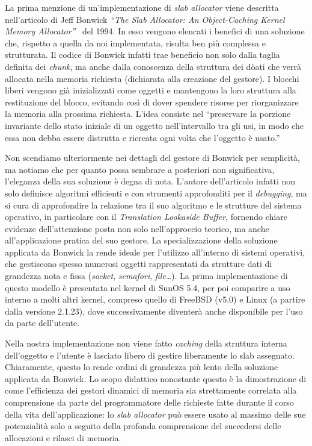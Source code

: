 La prima menzione di un’implementazione di \textit{slab allocator} viene descritta nell’articolo di Jeff Bonwick \textit{“The Slab Allocator: An Object-Caching Kernel Memory Allocator”}~\cite{slab} del 1994. In esso vengono elencati i benefici di una soluzione che, rispetto a quella da noi implementata, risulta ben più complessa e strutturata. Il codice di Bonwick infatti trae beneficio non solo dalla taglia definita dei \textit{chunk}, ma anche dalla conoscenza della struttura dei dòati che verrà allocata nella memoria richiesta (dichiarata alla creazione del gestore). I blocchi liberi vengono già inizializzati come oggetti e mantengono la loro struttura alla restituzione del blocco, evitando così di dover spendere risorse per riorganizzare la memoria alla prossima richiesta. L’idea consiste nel “preservare la porzione invariante dello stato iniziale di un oggetto nell’intervallo tra gli usi, in modo che essa non debba essere distrutta e ricreata ogni volta che l’oggetto è usato.”

Non scendiamo ulteriormente nei dettagli del gestore di Bonwick per semplicità, ma notiamo che per quanto possa sembrare a posteriori non significativa, l’eleganza della sua soluzione è degna di nota. L’autore dell’articolo infatti non solo definisce algoritmi efficienti e con strumenti approfonditi per il \textit{debugging}, ma si cura di approfondire la relazione tra il suo algoritmo e le strutture del sistema operativo, in particolare con il \textit{Translation Lookaside Buffer}, fornendo chiare evidenze dell’attenzione posta non solo nell’approccio teorico, ma anche all’applicazione pratica del suo gestore. La specializzazione della soluzione applicata da Bonwick la rende ideale per l’utilizzo all’interno di sistemi operativi, che gestiscono spesso numerosi oggetti rappresentati da strutture dati di grandezza nota e fissa (\textit{socket}, \textit{semafori}, \textit{file}…). La prima implementazione di questo modello è presentata nel kernel di SunOS 5.4, per poi comparire a uso interno a molti altri kernel, compreso quello di FreeBSD (v5.0) e Linux (a partire dalla versione 2.1.23), dove successivamente diventerà anche disponibile per l’uso da parte dell’utente.

Nella nostra implementazione non viene fatto \textit{caching} della struttura interna dell’oggetto e l’utente è lasciato libero di gestire liberamente lo slab assegnato. Chiaramente, questo lo rende ordini di grandezza più lento della soluzione applicata da Bonwick. Lo scopo didattico nonostante questo è la dimostrazione di come l’efficienza dei gestori dinamici di memoria sia strettamente correlata alla comprensione da parte del programmatore delle richieste fatte durante il corso della vita dell’applicazione: lo \textit{slab allocator} può essere usato al massimo delle sue potenzialità solo a seguito della profonda comprensione del succedersi delle allocazioni e rilasci di memoria.

